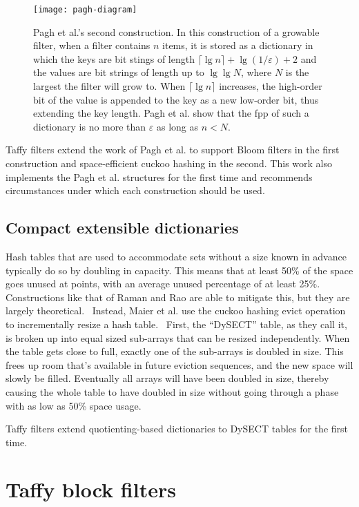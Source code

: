\documentclass[letterpaper,twocolumn,10pt]{article}
\newcommand{\etal}{et al.}
\begin{document}
\begin{figure}
\texttt{[image: pagh-diagram]}
\caption{\label{pagh-diagram}
Pagh \etal{}'s second construction.
In this construction of a growable filter, when a filter contains $n$ items, it is stored as a dictionary in which the keys are bit stings of length $\lceil \lg n \rceil + \lg (1/\varepsilon) + 2$ and the values are bit strings of length up to $\lg \lg N$, where $N$ is the largest the filter will grow to.
When $\lceil \lg n \rceil$ increases, the high-order bit of the value is appended to the key as a new low-order bit, thus extending the key length.
Pagh \etal{} show that the fpp of such a dictionary is no more than $\varepsilon$ as long as $n < N$.
}
\end{figure}

Taffy filters extend the work of Pagh \etal{} to support Bloom filters in the first construction and space-efficient cuckoo hashing in the second.
This work also implements the Pagh \etal{} structures for the first time and recommends circumstances under which each construction should be used.

\subsection{Compact extensible dictionaries}

Hash tables that are used to accommodate sets without a size known in advance typically do so by doubling in capacity.
This means that at least 50\% of the space goes unused at points, with an average unused percentage of at least 25\%.
Constructions like that of Raman and Rao are able to mitigate this, but they are largely theoretical.~\cite{succinct}
Instead, Maier \etal{} use the cuckoo hashing evict operation to incrementally resize a hash table.~\cite{dysect}
First, the ``DySECT'' table, as they call it, is broken up into equal sized sub-arrays that can be resized independently.
When the table gets close to full, exactly one of the sub-arrays is doubled in size.
This frees up room that's available in future eviction sequences, and the new space will slowly be filled.
Eventually all arrays will have been doubled in size, thereby causing the whole table to have doubled in size without going through a phase with as low as 50\% space usage.

Taffy filters extend quotienting-based dictionaries to DySECT tables for the first time.

\section{Taffy block filters}
\label{pbf}
\end{document}
